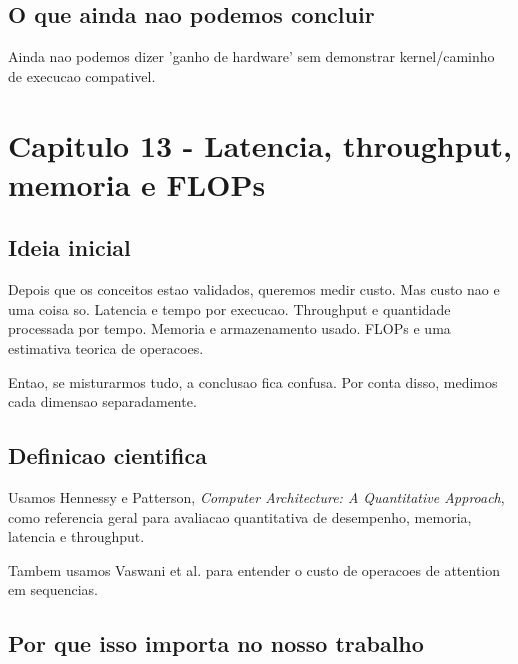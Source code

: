 \subsection{O que ainda nao podemos concluir}




Ainda nao podemos dizer 'ganho de hardware' sem demonstrar kernel/caminho de execucao compativel.



\section{Capitulo 13 - Latencia, throughput, memoria e FLOPs}



\subsection{Ideia inicial}






Depois que os conceitos estao validados, queremos medir custo. Mas custo nao e uma coisa so. Latencia e tempo por execucao. Throughput e quantidade processada por tempo. Memoria e armazenamento usado. FLOPs e uma estimativa teorica de operacoes.




Entao, se misturarmos tudo, a conclusao fica confusa. Por conta disso, medimos cada dimensao separadamente.



\subsection{Definicao cientifica}





Usamos Hennessy e Patterson, \emph{Computer Architecture: A Quantitative Approach}, como referencia geral para avaliacao quantitativa de desempenho, memoria, latencia e throughput.




Tambem usamos Vaswani et al. para entender o custo de operacoes de attention em sequencias.



\subsection{Por que isso importa no nosso trabalho}





